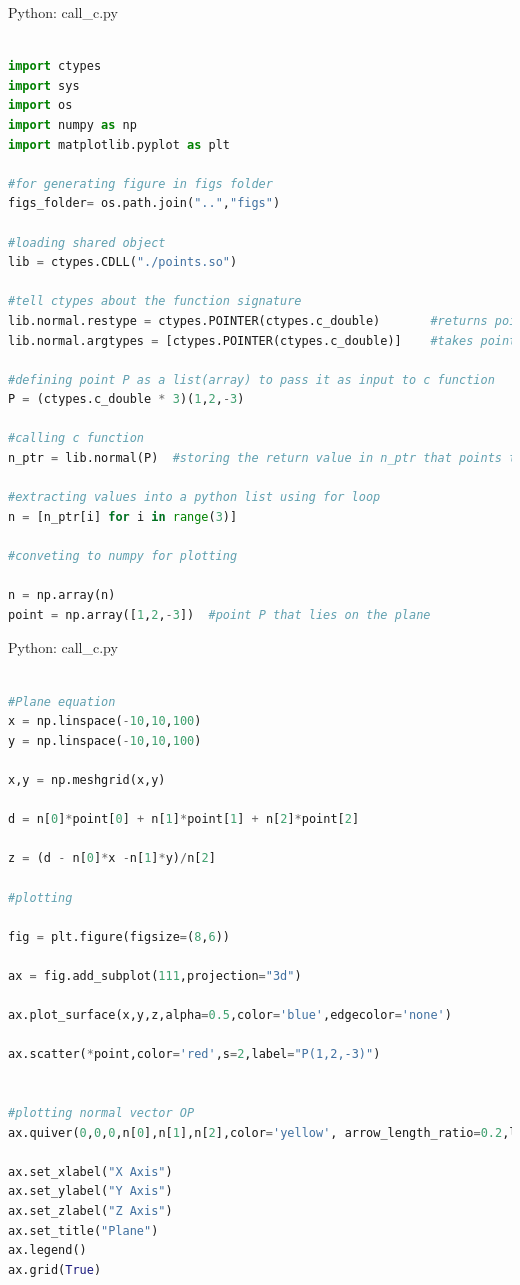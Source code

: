 \documentclass{beamer}
\numberwithin{equation}{section}
\theoremstyle{remark}
\begin{document}
\begin{frame}[fragile]{Python: call\_c.py}
\begin{lstlisting}[language=Python]

import ctypes
import sys
import os
import numpy as np
import matplotlib.pyplot as plt

#for generating figure in figs folder
figs_folder= os.path.join("..","figs")

#loading shared object 
lib = ctypes.CDLL("./points.so")

#tell ctypes about the function signature
lib.normal.restype = ctypes.POINTER(ctypes.c_double)       #returns pointer to double
lib.normal.argtypes = [ctypes.POINTER(ctypes.c_double)]    #takes pointer to array

#defining point P as a list(array) to pass it as input to c function
P = (ctypes.c_double * 3)(1,2,-3)

#calling c function
n_ptr = lib.normal(P)  #storing the return value in n_ptr that points to memory location of [1,2,-3]

#extracting values into a python list using for loop
n = [n_ptr[i] for i in range(3)] 

#conveting to numpy for plotting

n = np.array(n)
point = np.array([1,2,-3])  #point P that lies on the plane

\end{lstlisting}
\end{frame}

\begin{frame}[fragile]{Python: call\_c.py}
\begin{lstlisting}[language=Python]

#Plane equation
x = np.linspace(-10,10,100)
y = np.linspace(-10,10,100)

x,y = np.meshgrid(x,y)

d = n[0]*point[0] + n[1]*point[1] + n[2]*point[2]

z = (d - n[0]*x -n[1]*y)/n[2]

#plotting

fig = plt.figure(figsize=(8,6))

ax = fig.add_subplot(111,projection="3d")

ax.plot_surface(x,y,z,alpha=0.5,color='blue',edgecolor='none')

ax.scatter(*point,color='red',s=2,label="P(1,2,-3)")


#plotting normal vector OP 
ax.quiver(0,0,0,n[0],n[1],n[2],color='yellow', arrow_length_ratio=0.2,label="Normal Vector")

ax.set_xlabel("X Axis")
ax.set_ylabel("Y Axis")
ax.set_zlabel("Z Axis")
ax.set_title("Plane")
ax.legend()
ax.grid(True)

\end{lstlisting}
\end{frame}
\end{document}
